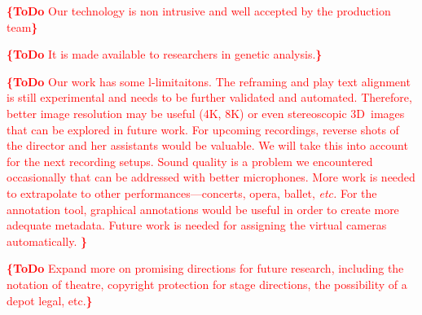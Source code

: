 \documentclass[conference]{IEEEtran}
\newcommand{\todo}[1]{\noindent\textcolor{red}{{\bf \{ToDo} #1{\bf \}}}}
\begin{document}
\todo{Our technology is non intrusive and well accepted by the production team}

\todo{It is made available to researchers in genetic analysis.}

\todo{Our work has some l-limitaitons. 
The reframing and play text alignment is still experimental
and needs to be further validated and automated.
Therefore, better image resolution may be useful (4K, 8K)
or even stereoscopic 3D~images that can be explored in future work.
For upcoming recordings, reverse shots of the director and her assistants would be valuable.
We will take this into account for the next recording setups.
Sound quality is a problem we encountered occasionally that can be addressed with better microphones.
More work is needed to extrapolate to other performances---concerts, opera, ballet, \emph{etc.}
For the annotation tool, graphical annotations would be useful
in order to create more adequate metadata.
Future work is needed for assigning the virtual cameras automatically.
}



\todo{Expand more on promising directions for future research, including the notation of theatre,
copyright protection for stage directions, the possibility of a depot legal, etc.}












\end{document}
